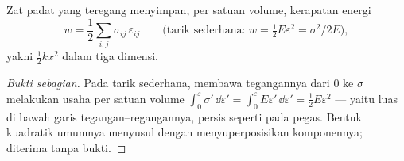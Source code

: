 \begin{proposition}\label{prop:b3:continuum-elasticity:energy}
Zat padat yang teregang menyimpan, per satuan volume, kerapatan energi
\[
w = \frac12\sum_{i,j}\sigma_{ij}\,\varepsilon_{ij}
\qquad\text{(tarik sederhana: } w = \tfrac12 E\varepsilon^2 =
\sigma^2/2E\text{)} ,
\]
yakni $\tfrac12 kx^2$ dalam tiga dimensi.
\end{proposition}

\begin{proof}[Bukti sebagian]
Pada tarik sederhana, membawa tegangannya dari $0$ ke $\sigma$
melakukan usaha per satuan volume $\int_0^\varepsilon\sigma'\,\dd\varepsilon' =
\int_0^\varepsilon E\varepsilon'\,\dd\varepsilon' = \tfrac12
E\varepsilon^2$ --- yaitu luas di bawah garis tegangan--regangannya,
persis seperti pada pegas. Bentuk kuadratik umumnya menyusul dengan
menyuperposisikan komponennya; diterima tanpa bukti.
\end{proof}


